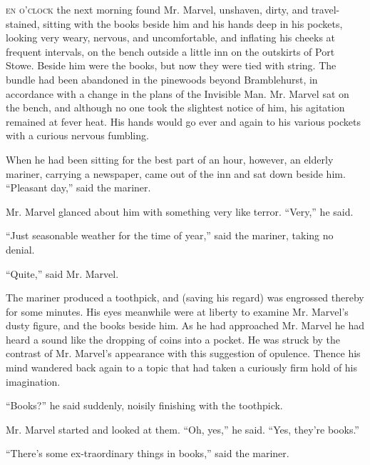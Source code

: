 \label{ch:14}
\begin{ChapterStart}
\vspace*{2\nbs}

\vspace{1.5\nbs}
\end{ChapterStart}

\kern-3pt\textsc{en o’clock} the next morning found Mr. Marvel, unshaven, dirty, and travel-stained, sitting with the books beside him and his hands deep in his pockets, looking very weary, nervous, and uncomfortable, and inflating his cheeks at frequent intervals, on the bench outside a little inn on the outskirts of Port Stowe. Beside him were the books, but now they were tied with string. The bundle had been abandoned in the pinewoods beyond Bramblehurst, in accordance with a change in the plans of the Invisible Man. Mr. Marvel sat on the bench, and although no one took the slightest notice of him, his agitation remained at fever heat. His hands would go ever and again to his various pockets with a curious nervous fumbling.

When he had been sitting for the best part of an hour, however, an elderly mariner, carrying a newspaper, came out of the inn and sat down beside him. “Pleasant day,” said the mariner.

Mr. Marvel glanced about him with something very like terror. “Very,” he said.

“Just seasonable weather for the time of year,” said the mariner, taking no denial.

“Quite,” said Mr. Marvel.

The mariner produced a toothpick, and (saving his regard) was engrossed thereby for some minutes. His eyes meanwhile were at liberty to examine Mr. Marvel’s dusty figure, and the books beside him. As he had approached Mr. Marvel he had heard a sound like the dropping of coins into a pocket. He was struck by the contrast of Mr. Marvel’s appearance with this suggestion of opulence. Thence his mind wandered back again to a topic that had taken a curiously firm hold of his imagination.

“Books?” he said suddenly, noisily finishing with the toothpick.

Mr. Marvel started and looked at them. “Oh, yes,” he said. “Yes, they’re books.”

“There’s some ex-traordinary things in books,” said the mariner.

